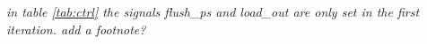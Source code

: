 \documentclass[mscthesis]{usiinfthesis}
\begin{document}
\emph{\color{red} in table \ref{tab:ctrl} the signals flush\_ps and load\_out
are only set in the first iteration. add a footnote?}

\end{document}
